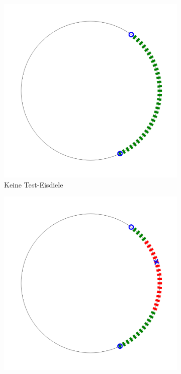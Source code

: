 \documentclass[a4paper,10pt,ngerman,captions=figureheading]{scrartcl}
\newcommand{\imageWidth}{0.3\linewidth}
\begin{document}
\begin{figure}[h!t]
    \centering
    \caption{Test-Eisdielen Anordnung im Sektor}
    \begin{subfigure}[t]{\imageWidth}
        \includegraphics[width=\linewidth]{06_no_test_ice.png}
        \caption{Keine Test-Eisdiele}
        \label{fig:06_no_test_ice}
    \end{subfigure}
    \begin{subfigure}[t]{\imageWidth}
        \includegraphics[width=\linewidth]{07_one_test_ice.png}

\end{subfigure}
\end{figure}
\end{document}
